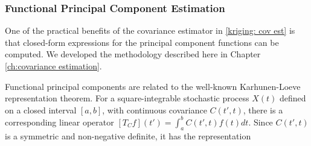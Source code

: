 


\subsubsection{Functional Principal Component Estimation} %
\label{sub:FPC estimation}

One of the practical benefits of the covariance estimator in \eqref{kriging: cov est} is that closed-form expressions for the principal component functions can be computed. We developed the methodology described here in Chapter \ref{ch:covariance estimation}.

Functional principal components are related to the well-known Karhunen-Loeve representation theorem. For a square-integrable stochastic process $X(t)$ defined on a closed interval $[a,b]$, with continuous covariance $C(t',t)$, there is a corresponding linear operator $[T_Cf](t') = \int_a^bC(t',t)f(t)dt$. Since $C(t',t)$ is a symmetric and non-negative definite, it has the representation 

